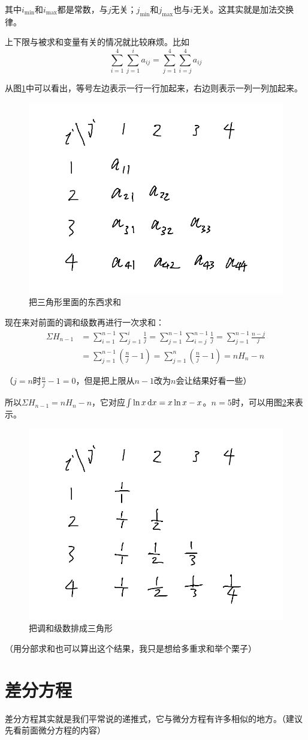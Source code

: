 其中$i_\text{min}$和$i_\text{max}$都是常数，与$j$无关；$j_\text{min}$和$j_\text{max}$也与$i$无关。这其实就是加法交换律。

上下限与被求和变量有关的情况就比较麻烦。比如
\begin{equation*}
\sum_{i=1}^4 \sum_{j=1}^i a_{i j}=\sum_{j=1}^4 \sum_{i=j}^4 a_{i j}
\end{equation*}

从图\ref{fig-triangle-sum}中可以看出，等号左边表示一行一行加起来，右边则表示一列一列加起来。
\begin{figure}[htb]
\centering
\includegraphics[width=0.33\linewidth]{fig/triangle-sum.png}
\caption{把三角形里面的东西求和}
\label{fig-triangle-sum}
\end{figure}

现在来对前面的调和级数再进行一次求和：
\begin{align*}
\Sigma H_{n-1}&=\sum_{i=1}^{n-1} \sum_{j=1}^i \frac{1}{j}=\sum_{j=1}^{n-1} \sum_{i=j}^{n-1} \frac{1}{j}=\sum_{j=1}^{n-1} \frac{n-j}{j} \\
&=\sum_{j=1}^{n-1} (\frac{n}{j}-1)=\sum_{j=1}^{n} (\frac{n}{j}-1)=n H_n-n
\end{align*}

（$j=n$时$\frac{n}{j}-1=0$，但是把上限从$n-1$改为$n$会让结果好看一些）

所以$\Sigma H_{n-1}=n H_n-n$，它对应$\int \ln x \mathop{}\!\mathrm{d} x=x \ln x-x$。$n=5$时，可以用图\ref{fig-triangle-harmonic}来表示。
\begin{figure}[htb]
\centering
\includegraphics[width=0.33\linewidth]{fig/triangle-harmonic.png}
\caption{把调和级数排成三角形}
\label{fig-triangle-harmonic}
\end{figure}

（用分部求和也可以算出这个结果，我只是想给多重求和举个栗子）
\section{差分方程}
差分方程其实就是我们平常说的递推式，它与微分方程有许多相似的地方。（建议先看前面微分方程的内容）

